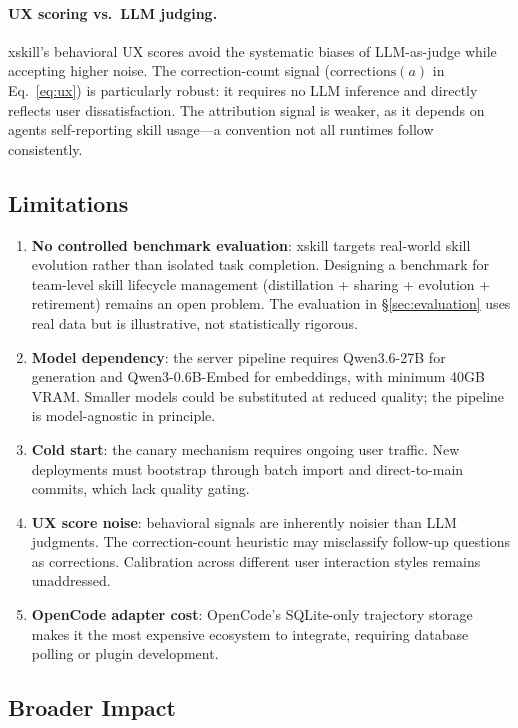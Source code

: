 \documentclass{article}
\begin{document}
\paragraph{UX scoring vs.\ LLM judging.} xskill's behavioral UX scores avoid the systematic biases of LLM-as-judge while accepting higher noise. The correction-count signal ($\mathrm{corrections}(a)$ in Eq.~\ref{eq:ux}) is particularly robust: it requires no LLM inference and directly reflects user dissatisfaction. The attribution signal is weaker, as it depends on agents self-reporting skill usage---a convention not all runtimes follow consistently.

\subsection{Limitations}

\begin{enumerate}
    \item \textbf{No controlled benchmark evaluation}: xskill targets real-world skill evolution rather than isolated task completion. Designing a benchmark for team-level skill lifecycle management (distillation + sharing + evolution + retirement) remains an open problem. The evaluation in \S\ref{sec:evaluation} uses real data but is illustrative, not statistically rigorous.
    \item \textbf{Model dependency}: the server pipeline requires Qwen3.6-27B for generation and Qwen3-0.6B-Embed for embeddings, with minimum 40GB VRAM. Smaller models could be substituted at reduced quality; the pipeline is model-agnostic in principle.
    \item \textbf{Cold start}: the canary mechanism requires ongoing user traffic. New deployments must bootstrap through batch import and direct-to-main commits, which lack quality gating.
    \item \textbf{UX score noise}: behavioral signals are inherently noisier than LLM judgments. The correction-count heuristic may misclassify follow-up questions as corrections. Calibration across different user interaction styles remains unaddressed.
    \item \textbf{OpenCode adapter cost}: OpenCode's SQLite-only trajectory storage makes it the most expensive ecosystem to integrate, requiring database polling or plugin development.
\end{enumerate}

\subsection{Broader Impact}
\end{document}
